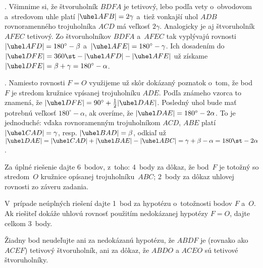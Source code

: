 {\smallskip
{}. Všimnime si, že štvoruholník $BDFA$ je
tetivový, lebo podľa vety o~obvodovom a~stredovom uhle platí
$|\uhel AFB|=2\gamma$ a~tiež vonkajší uhol $ADB$ rovnoramenného
trojuholníka $ACD$ má veľkosť $2\gamma$. Analogicky je aj
štvoruholník $AFEC$ tetivový. Zo štvoruholníkov $BDFA$ a~$AFEC$ tak
vyplývajú rovnosti $|\uhel AFD|=180^\circ-\beta$
a~$|\uhel AFE|=180^\circ-\gamma$. Ich dosadením do
$|\uhel DFE|=360\st-|\uhel AFD|-|\uhel AFE|$ už získame
$|\uhel DFE|=\beta+\gamma=180^\circ-\alpha$.

\smallskip
{}. Namiesto rovnosti $F=O$ využijeme už skôr
dokázaný poznatok o~tom, že bod $F$ je stredom
kružnice vpísanej trojuholníku $ADE$. Podľa známeho vzorca to znamená,
že $|\uhel DFE|=90^\circ+\frac12|\uhel DAE|$.
Posledný uhol bude mať potrebnú veľkosť $180^\circ-\alpha$,
ak overíme, že $|\uhel DAE|=180^\circ-2\alpha$. To je jednoduché:
vďaka rovnoramenným trojuholníkom $ACD$, $ABE$ platí
$|\uhel CAD|=\gamma$, resp. $|\uhel BAD|=\beta$, odkiaľ už
$|\uhel DAE|=|\uhel CAD|+ |\uhel BAE|-|\uhel ABC|=\gamma+\beta-\alpha=180\st-2\alpha$.

\schemaABC
Za úplné riešenie dajte 6~bodov, z~toho: 4~body
za dôkaz, že bod~$F$ je totožný so stredom~$O$ kružnice opísanej
trojuholníku~$ABC$; 2~body za dôkaz uhlovej rovnosti zo záveru zadania.

V~prípade neúplných riešení dajte 1~bod za hypotézu
o~totožnosti bodov $F$ a~$O$. Ak riešiteľ dokáže uhlovú
rovnosť použitím nedokázanej hypotézy $F=O$, dajte celkom 3~body.

Žiadny bod neudeľujte ani za nedokázanú hypotézu, že $ABDF$ je
(rovnako ako $ACEF$) tetivový štvoruholník, ani za dôkaz, že
$ABDO$ a $ACEO$ sú tetivové štvoruholníky.
\endschema
}

